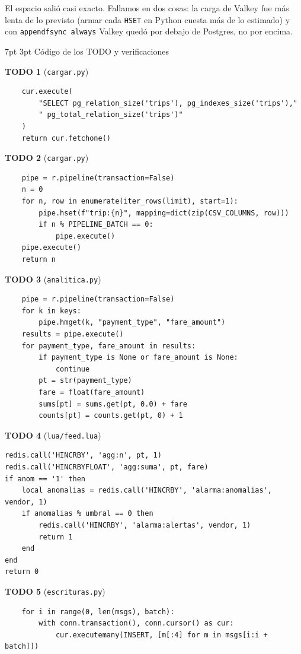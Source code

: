 \documentclass[10pt,letterpaper]{article}
\makeatletter
\renewcommand\section{\@startsection{section}{1}{\z@}%
  {7pt \@plus 2pt \@minus 1pt}{3pt}%
  {\normalfont\normalsize\bfseries\color{acc}}}
\makeatother
\begin{document}
El espacio salió casi exacto. Fallamos en dos cosas: la carga de Valkey fue más lenta de lo previsto
(armar cada \texttt{HSET} en Python cuesta más de lo estimado) y con \texttt{appendfsync always} Valkey
quedó por debajo de Postgres, no por encima.

\section{Código de los TODO y verificaciones}

\textbf{TODO 1} (\texttt{cargar.py})
\begin{Verbatim}
    cur.execute(
        "SELECT pg_relation_size('trips'), pg_indexes_size('trips'),"
        " pg_total_relation_size('trips')"
    )
    return cur.fetchone()
\end{Verbatim}

\textbf{TODO 2} (\texttt{cargar.py})
\begin{Verbatim}
    pipe = r.pipeline(transaction=False)
    n = 0
    for n, row in enumerate(iter_rows(limit), start=1):
        pipe.hset(f"trip:{n}", mapping=dict(zip(CSV_COLUMNS, row)))
        if n % PIPELINE_BATCH == 0:
            pipe.execute()
    pipe.execute()
    return n
\end{Verbatim}

\textbf{TODO 3} (\texttt{analitica.py})
\begin{Verbatim}
    pipe = r.pipeline(transaction=False)
    for k in keys:
        pipe.hmget(k, "payment_type", "fare_amount")
    results = pipe.execute()
    for payment_type, fare_amount in results:
        if payment_type is None or fare_amount is None:
            continue
        pt = str(payment_type)
        fare = float(fare_amount)
        sums[pt] = sums.get(pt, 0.0) + fare
        counts[pt] = counts.get(pt, 0) + 1
\end{Verbatim}

\textbf{TODO 4} (\texttt{lua/feed.lua})
\begin{Verbatim}
redis.call('HINCRBY', 'agg:n', pt, 1)
redis.call('HINCRBYFLOAT', 'agg:suma', pt, fare)
if anom == '1' then
    local anomalias = redis.call('HINCRBY', 'alarma:anomalias', vendor, 1)
    if anomalias % umbral == 0 then
        redis.call('HINCRBY', 'alarma:alertas', vendor, 1)
        return 1
    end
end
return 0
\end{Verbatim}

\textbf{TODO 5} (\texttt{escrituras.py})
\begin{Verbatim}
    for i in range(0, len(msgs), batch):
        with conn.transaction(), conn.cursor() as cur:
            cur.executemany(INSERT, [m[:4] for m in msgs[i:i + batch]])
\end{Verbatim}
\end{document}

